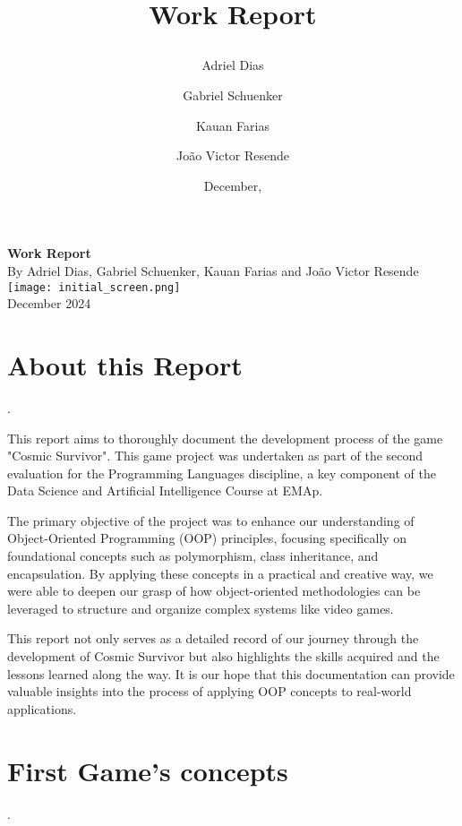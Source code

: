 \documentclass[a4paper,12pt]{article}
\title{
  \textbf{Work Report}
  
}
\author{Adriel Dias \and Gabriel Schuenker \and Kauan Farias \and João Victor Resende}
\date{December, }
\begin{document}
\begin{titlepage}
    \begin{center}
        \vspace*{2cm} %
        {\Huge \textbf{Work Report}} \\ %
        \vspace{1.5cm}
        {\Large By Adriel Dias, Gabriel Schuenker, Kauan Farias and João Victor Resende} \\ %
        \vspace{2cm}
        \texttt{[image: initial\_screen.png]} \\ %
        \vspace{2cm}
        {\large December 2024} %
    \end{center}
\end{titlepage}


    \thispagestyle{empty}
\vspace{1em}


\newpage


\section*{About this Report}
.

This report aims to thoroughly document the development process of the game "Cosmic Survivor". This game project was undertaken as part of the second evaluation for the Programming Languages discipline, a key component of the Data Science and Artificial Intelligence Course at EMAp.

The primary objective of the project was to enhance our understanding of Object-Oriented Programming (OOP) principles, focusing specifically on foundational concepts such as polymorphism, class inheritance, and encapsulation. By applying these concepts in a practical and creative way, we were able to deepen our grasp of how object-oriented methodologies can be leveraged to structure and organize complex systems like video games.

This report not only serves as a detailed record of our journey through the development of Cosmic Survivor but also highlights the skills acquired and the lessons learned along the way. It is our hope that this documentation can provide valuable insights into the process of applying OOP concepts to real-world applications.

\newpage


\section*{First Game's concepts}
.
\end{document}
